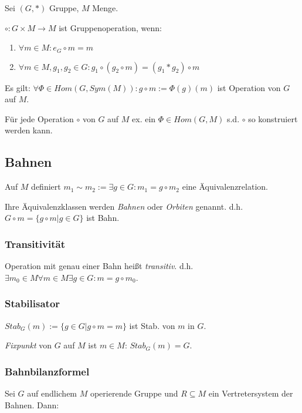 Sei $(G,*)$ Gruppe, $M$ Menge.

$\circ : G \times M \rightarrow M$ ist Gruppenoperation, wenn:

\begin{enumerate}[label=(\alph*)]
	\item $\forall m \in M : e_G \circ m = m$
	\item $\forall m \in M, g_1, g_2 \in G : g_1 \circ ( g_2 \circ m ) = ( g_1 * g_2 ) \circ m$
\end{enumerate}

Es gilt: $\forall \Phi \in Hom(G,Sym(M)) : g \circ m := \Phi(g)(m)$ ist Operation von $G$ auf $M$.

Für jede Operation $\circ$ von $G$ auf $M$ ex. ein $\Phi \in Hom(G,M)$ s.d. $\circ$ so konstruiert werden kann.

\subsection*{Bahnen}

Auf $M$ definiert $m_1 \sim m_2 := \exists g \in G : m_1 = g \circ m_2$ eine Äquivalenzrelation.

Ihre Äquivalenzklassen werden \emph{Bahnen} oder \emph{Orbiten} genannt. d.h. $G \circ m = \{ g \circ m | g \in G \}$ ist Bahn.

\subsubsection*{Transitivität}

Operation mit genau einer Bahn heißt \emph{transitiv}. d.h. $\exists m_0 \in M \forall m \in M \exists g \in G : m = g \circ m_0$.

\subsubsection*{Stabilisator}

$Stab_G(m) := \{ g \in G | g \circ m = m \}$ ist Stab. von $m$ in $G$.

\emph{Fixpunkt} von $G$ auf $M$ ist $m \in M$: $Stab_G(m) = G$.

\subsubsection*{Bahnbilanzformel}

Sei $G$ auf endlichem $M$ operierende Gruppe und $R \subseteq M$ ein Vertretersystem der Bahnen. Dann:

